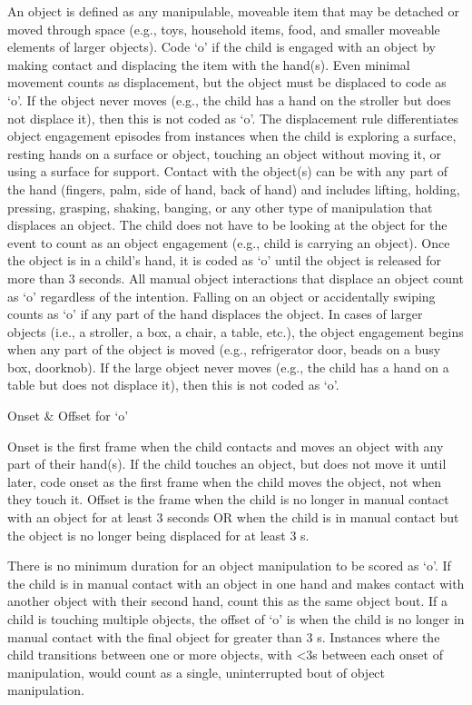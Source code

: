 \documentclass[
  12pt,
]{book}
\begin{document}
An object is defined as any manipulable, moveable item that may be detached or moved through space (e.g., toys, household items, food, and smaller moveable elements of larger objects). Code `o' if the child is engaged with an object by making contact and displacing the item with the hand(s). Even minimal movement counts as displacement, but the object must be displaced to code as `o'. If the object never moves (e.g., the child has a hand on the stroller but does not displace it), then this is not coded as `o'. The displacement rule differentiates object engagement episodes from instances when the child is exploring a surface, resting hands on a surface or object, touching an object without moving it, or using a surface for support.
Contact with the object(s) can be with any part of the hand (fingers, palm, side of hand, back of hand) and includes lifting, holding, pressing, grasping, shaking, banging, or any other type of manipulation that displaces an object. The child does not have to be looking at the object for the event to count as an object engagement (e.g., child is carrying an object). Once the object is in a child's hand, it is coded as `o' until the object is released for more than 3 seconds. All manual object interactions that displace an object count as `o' regardless of the intention. Falling on an object or accidentally swiping counts as `o' if any part of the hand displaces the object.
In cases of larger objects (i.e., a stroller, a box, a chair, a table, etc.), the object engagement begins when any part of the object is moved (e.g., refrigerator door, beads on a busy box, doorknob). If the large object never moves (e.g., the child has a hand on a table but does not displace it), then this is not coded as `o'.

Onset \& Offset for `o'

Onset is the first frame when the child contacts and moves an object with any part of their hand(s). If the child touches an object, but does not move it until later, code onset as the first frame when the child moves the object, not when they touch it.
Offset is the frame when the child is no longer in manual contact with an object for at least 3 seconds OR when the child is in manual contact but the object is no longer being displaced for at least 3 s.

There is no minimum duration for an object manipulation to be scored as `o'. If the child is in manual contact with an object in one hand and makes contact with another object with their second hand, count this as the same object bout. If a child is touching multiple objects, the offset of `o' is when the child is no longer in manual contact with the final object for greater than 3 s. Instances where the child transitions between one or more objects, with \textless3s between each onset of manipulation, would count as a single, uninterrupted bout of object manipulation.
\end{document}
